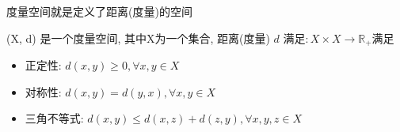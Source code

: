 \begin{Chinese Note}
    度量空间就是定义了距离(度量)的空间
\end{Chinese Note}

\begin{tcolorbox}
    [colback=Emerald!10,colframe=cyan!40!black,title=\textbf{度量空间}]
    (X, d) 是一个度量空间, 其中X为一个集合, 距离(度量) $d$ 满足$: X\times X\rightarrow \mathbb{R}_+$满足
    \begin{itemize}
        \item 正定性: $d(x,y)\geq 0,\forall x,y\in X$
        \item 对称性: $d(x,y)=d(y,x),\forall x,y\in X$
        \item 三角不等式: $d(x,y)\leq d(x,z)+d(z,y),\forall x,y,z\in X$
    \end{itemize}
\end{tcolorbox}